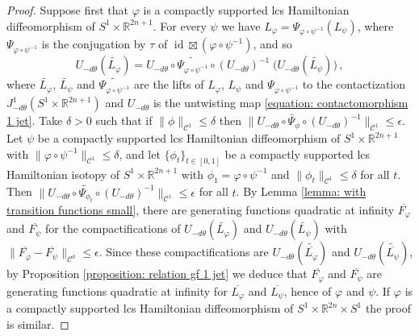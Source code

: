 \documentclass{amsart}
\DeclareMathOperator{\id}{id}
\theoremstyle{remark}
\begin{document}
\begin{proof}
Suppose first that $\varphi$ is
a compactly supported lcs Hamiltonian diffeomorphism
of $S^1 \times \mathbb{R}^{2n+1}$.
For every $\psi$ we have
$L_{\varphi} = \Psi_{\varphi \circ \psi^{-1}} (L_{\psi})$,
where $\Psi_{\varphi \circ \psi^{-1}}$ is the conjugation by $\tau$
of $\id \boxtimes (\varphi \circ \psi^{-1})$,
and so
$$
U_{-d\theta} (\widetilde{L_{\varphi}})
= U_{-d\theta} \circ \widetilde{\Psi_{\varphi \circ \psi^{-1}}} \circ (U_{-d\theta})^{-1}
\; \big(U_{-d\theta} (\widetilde{L_{\psi}})\big) \,,
$$
where $\widetilde{L_{\varphi}}$,
$\widetilde{L_{\psi}}$ and $\widetilde{\Psi_{\varphi \circ \psi^{-1}}}$
are the lifts of $L_{\varphi}$, $L_{\psi}$ and $\Psi_{\varphi \circ \psi^{-1}}$
to the contactization $J^1_{-d\theta} (S^1 \times \mathbb{R}^{2n+1})$
and $U_{-d\theta}$ is the untwisting map \eqref{equation: contactomorphism 1 jet}.
Take $\delta > 0$ such that if $\lVert \phi \rVert_{\mathcal{C}^1} \leq \delta$
then $\lVert U_{-d\theta} \circ \widetilde{\Psi_{\phi}} \circ (U_{-d\theta})^{-1} \rVert_{\mathcal{C}^1}
\leq \epsilon$.
Let $\psi$ be a compactly supported lcs Hamiltonian diffeomorphism
of $S^1 \times \mathbb{R}^{2n+1}$
with $\lVert \varphi \circ \psi^{-1} \rVert_{\mathcal{C}^1} \leq \delta$,
and let $\{ \phi_t \}_{t \in [0,1]}$
be a compactly supported lcs Hamiltonian isotopy
of $S^1 \times \mathbb{R}^{2n+1}$
with $\phi_1 = \varphi \circ \psi^{-1}$
and $\lVert \phi_t \rVert_{\mathcal{C}^1} \leq \delta$
for all $t$.
Then
$\lVert U_{-d\theta} \circ \widetilde{\Psi_{\phi_t}} \circ (U_{-d\theta})^{-1} \rVert_{\mathcal{C}^1}
\leq \epsilon$ for all $t$.
By Lemma \ref{lemma: with transition functions small},
there are generating functions quadratic at infinity
$\overline{F_{\varphi}}$ and $\overline{F_{\psi}}$
for the compactifications of $U_{-d\theta} (\widetilde{L_{\varphi}})$
and $U_{-d\theta} (\widetilde{L_{\psi}})$
with $\lVert \overline{F_{\varphi}} - \overline{F_{\psi}} \rVert_{\mathcal{C}^0}
\leq \epsilon$.
Since these compactifications are
$U_{-d\theta} (\widetilde{\overline{L_{\varphi}}})$
and $U_{-d\theta} (\widetilde{\overline{L_{\psi}}})$,
by Proposition \ref{proposition: relation gf 1 jet}
we deduce that $\overline{F_{\varphi}}$ and $\overline{F_{\psi}}$
are generating functions quadratic at infinity
for $\overline{L_{\varphi}}$ and $\overline{L_{\psi}}$,
hence of $\varphi$ and $\psi$.
If $\varphi$ is a compactly supported lcs Hamiltonian diffeomorphism
of $S^1 \times \mathbb{R}^{2n} \times S^1$
the proof is similar.
\end{proof}
\end{document}
